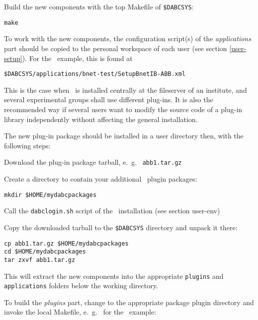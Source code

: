 \item Build the new components with the top Makefile of {\tt \$DABCSYS}:
\begin{verbatim}
make
\end{verbatim} 

\item To work with the new components, the configuration script(s) of the {\em applications} part should be copied
to the personal workspace of each user (see section \ref{user-setup}).
For the \ABB\ example, this is found at
\begin{verbatim}
$DABCSYS/applications/bnet-test/SetupBnetIB-ABB.xml
\end{verbatim} 
\enum





This is the case when \dabc\ is installed centrally at the fileserver
of an institute, and several experimental groups shall use different plug-ins.
It is also the recommended way if several users 
want to modify the source code of a plug-in library independently without 
affecting the general installation.


The new plug-in package should be installed in a user directory
then, with the following steps:

\bnum
\item Download the plug-in package tarball, e.~g.~ {\tt abb1.tar.gz}

\item Create a directory to contain your additional \dabc\ plugin packages:
\begin{verbatim}
mkdir $HOME/mydabcpackages
\end{verbatim} 

\item Call the {\tt dabclogin.sh} script of the \dabc\ installation (see section user-env)

\item Copy the downloaded tarball to the {\tt \$DABCSYS} directory and unpack it there:
\begin{verbatim}
cp abb1.tar.gz $HOME/mydabcpackages
cd $HOME/mydabcpackages
tar zxvf abb1.tar.gz
\end{verbatim} 
This will extract the new components into the appropriate {\tt plugins} and
{\tt applications} folders below the working directory. 

\item To build the {\em plugins} part, change to the appropriate package plugin
directory and invoke the local Makefile, e.~g.~ for the \ABB\ example:

